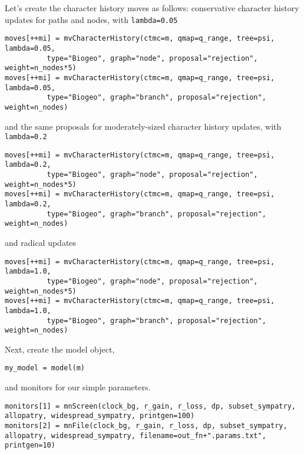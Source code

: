 Let's create the character history moves as follows: conservative character history updates for paths and nodes, with {\tt lambda=0.05}

\begin{snugshade}
\begin{lstlisting}
moves[++mi] = mvCharacterHistory(ctmc=m, qmap=q_range, tree=psi, lambda=0.05, 
          type="Biogeo", graph="node", proposal="rejection", weight=n_nodes*5)
moves[++mi] = mvCharacterHistory(ctmc=m, qmap=q_range, tree=psi, lambda=0.05, 
          type="Biogeo", graph="branch", proposal="rejection", weight=n_nodes)
\end{lstlisting}
\end{snugshade}

and the same proposals for moderately-sized character history updates, with {\tt lambda=0.2}

\begin{snugshade}
\begin{lstlisting}
moves[++mi] = mvCharacterHistory(ctmc=m, qmap=q_range, tree=psi, lambda=0.2, 
          type="Biogeo", graph="node", proposal="rejection", weight=n_nodes*5)
moves[++mi] = mvCharacterHistory(ctmc=m, qmap=q_range, tree=psi, lambda=0.2, 
          type="Biogeo", graph="branch", proposal="rejection", weight=n_nodes)
\end{lstlisting}
\end{snugshade}

and radical updates

\begin{snugshade}
\begin{lstlisting}
moves[++mi] = mvCharacterHistory(ctmc=m, qmap=q_range, tree=psi, lambda=1.0, 
          type="Biogeo", graph="node", proposal="rejection", weight=n_nodes*5)
moves[++mi] = mvCharacterHistory(ctmc=m, qmap=q_range, tree=psi, lambda=1.0, 
          type="Biogeo", graph="branch", proposal="rejection", weight=n_nodes)
\end{lstlisting}
\end{snugshade}


Next, create the model object,

\begin{snugshade}
\begin{lstlisting}
my_model = model(m)
\end{lstlisting}
\end{snugshade}

and monitors for our simple parameters.

\begin{snugshade}
\begin{lstlisting}
monitors[1] = mnScreen(clock_bg, r_gain, r_loss, dp, subset_sympatry, allopatry, widespread_sympatry, printgen=100)
monitors[2] = mnFile(clock_bg, r_gain, r_loss, dp, subset_sympatry, allopatry, widespread_sympatry, filename=out_fn+".params.txt", printgen=10)
\end{lstlisting}
\end{snugshade}

